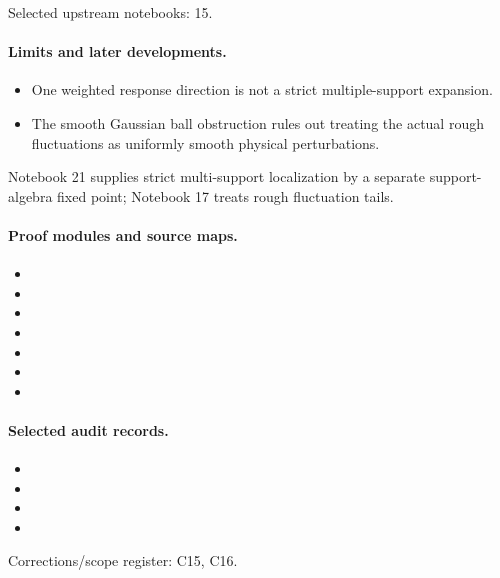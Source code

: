 Selected upstream notebooks: 15.\par

\paragraph{Limits and later developments.}
\begin{itemize}
\item One weighted response direction is not a strict multiple-support expansion.
\item The smooth Gaussian ball obstruction rules out treating the actual rough fluctuations as uniformly smooth physical perturbations.
\end{itemize}

Notebook 21 supplies strict multi-support localization by a separate support-algebra fixed point; Notebook 17 treats rough fluctuation tails.

\paragraph{Proof modules and source maps.}
\begingroup\small
\begin{itemize}
\item {}
\item {}
\item {}
\item {}
\item {}
\item {}
\item {}
\end{itemize}
\endgroup

\paragraph{Selected audit records.}
\begingroup\small
\begin{itemize}
\item {}
\item {}
\item {}
\item {}
\end{itemize}
\endgroup
Corrections/scope register: C15, C16.\par

